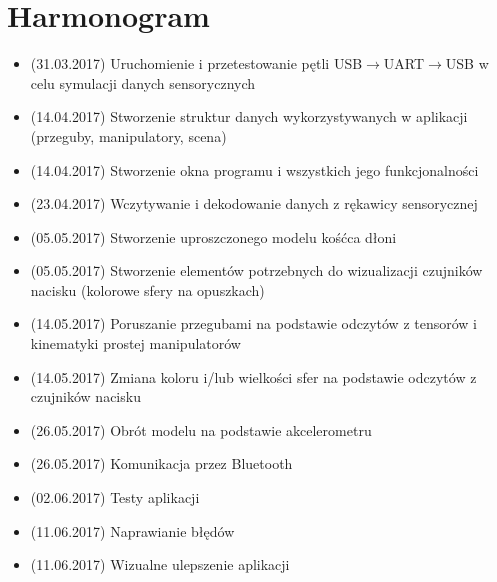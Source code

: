 \documentclass[12pt,a4paper]{article}
\begin{document}
\newpage
\section{Harmonogram}
\begin{itemize}
\item (31.03.2017) Uruchomienie i przetestowanie pętli USB$\rightarrow $UART$\rightarrow $USB w celu symulacji danych sensorycznych 
\item (14.04.2017) Stworzenie struktur danych wykorzystywanych w aplikacji (przeguby, manipulatory, scena)
\item (14.04.2017) Stworzenie okna programu i wszystkich jego funkcjonalności
\item (23.04.2017) Wczytywanie i dekodowanie danych z rękawicy sensorycznej
\item (05.05.2017) Stworzenie uproszczonego modelu kośćca dłoni
\item (05.05.2017) Stworzenie elementów potrzebnych do wizualizacji czujników nacisku (kolorowe sfery na opuszkach)
\item (14.05.2017) Poruszanie przegubami na podstawie odczytów z tensorów i kinematyki prostej manipulatorów
\item (14.05.2017) Zmiana koloru i/lub wielkości sfer na podstawie odczytów z czujników nacisku
\item (26.05.2017) Obrót modelu na podstawie akcelerometru
\item (26.05.2017) Komunikacja przez Bluetooth
\item (02.06.2017) Testy aplikacji
\item (11.06.2017) Naprawianie błędów
\item (11.06.2017) Wizualne ulepszenie aplikacji
\end{itemize}


\end{document}
